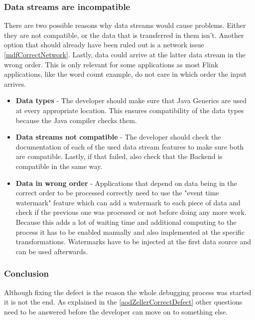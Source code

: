 \subsubsection{Data streams are incompatible}
\label{mdfCorrectDataStreams}
There are two possible reasons why data streams would cause problems. Either they are not compatible, or the data that is transferred in them isn't. Another option that should already have been ruled out is a network issue \ref{mdfCorrectNetwork}. Lastly, data could arrive at the latter data stream in the wrong order. This is only relevant for some applications as most Flink applications, like the word count example, do not care in which order the input arrives.
\begin{itemize}
  \item \textbf{Data types} - The developer should make sure that Java Generics are used at every appropriate location. This ensures compatibility of the data types because the Java compiler checks them.
  \item \textbf{Data streams not compatible} - The developer should check the documentation of each of the used data stream features to make sure both are compatible. Lastly, if that failed, also check that the Backend is compatible in the same way.
  \item \textbf{Data in wrong order} - Applications that depend on data being in the correct order to be processed correctly need to use the "event time watermark" feature which can add a watermark to each piece of data and check if the previous one was processed or not before doing any more work. Because this adds a lot of waiting time and additional computing to the process it has to be enabled manually and also implemented at the specific transformations. Watermarks have to be injected at the first data source and can be used afterwards.
\end{itemize}

\pagebreak

\subsubsection{Conclusion}
Although fixing the defect is the reason the whole debugging process was started it is not the end. As explained in the \ref{aodZellerCorrectDefect} other questions need to be answered before the developer can move on to something else.

